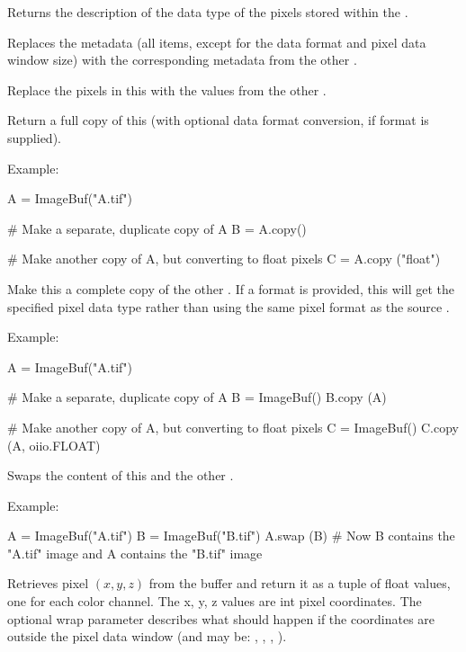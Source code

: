 Returns the description of the data type of the pixels stored within the
\ImageBuf.
\apiend

Replaces the metadata (all \ImageSpec items, except for the data format
and pixel data window size) with the corresponding metadata from the
other \ImageBuf.
\apiend

Replace the pixels in this \ImageBuf with the values from the other
\ImageBuf.
\apiend

Return a full copy of this \ImageBuf (with optional data format conversion,
if {\cf format} is supplied).

\noindent Example:
\begin{code}
    A = ImageBuf("A.tif")

    # Make a separate, duplicate copy of A
    B = A.copy()

    # Make another copy of A, but converting to float pixels
    C = A.copy ("float")
\end{code}
\apiend

Make this \ImageBuf a complete copy of the other \ImageBuf.
If a {\cf format} is provided, {\cf this} will get the specified pixel
data type rather than using the same pixel format as the source \ImageBuf.

\noindent Example:
\begin{code}
    A = ImageBuf("A.tif")

    # Make a separate, duplicate copy of A
    B = ImageBuf()
    B.copy (A)

    # Make another copy of A, but converting to float pixels
    C = ImageBuf()
    C.copy (A, oiio.FLOAT)
\end{code}
\apiend

Swaps the content of this \ImageBuf and the other \ImageBuf.

\noindent Example:
\begin{code}
    A = ImageBuf("A.tif")
    B = ImageBuf("B.tif")
    A.swap (B)
    # Now B contains the "A.tif" image and A contains the "B.tif" image
\end{code}
\apiend

Retrieves pixel $(x,y,z)$ from the buffer and return it as a tuple of
{\cf float} values, one for each color channel.  The {\cf x, y, z} values
are {\cf int} pixel coordinates.  The optional {\cf wrap} parameter
describes what should happen if the coordinates are outside the pixel data
window (and may be: , , , ).

